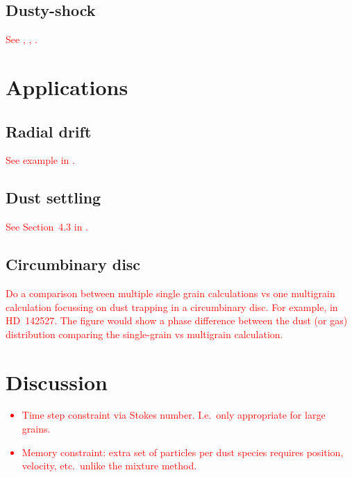 \documentclass[fleqn,usenatbib]{mnras}
\begin{document}
\subsection{Dusty-shock}

\textcolor{red}{
See \citet{Benitez-Llambay2019ApJS..241...25B},
\citet{Laibe2012MNRAS.420.2345L}, \citet{Lehmann2018MNRAS.476.3185L}.
}


\section{Applications}

\subsection{Radial drift}

\textcolor{red}{
See example in \citet{Dipierro2018MNRAS.479.4187D}.
}

\subsection{Dust settling}

\textcolor{red}{
See Section~4.3 in \citet{Hutchison2018MNRAS.476.2186H}.
}

\subsection{Circumbinary disc}

\textcolor{red}{
Do a comparison between multiple single grain calculations vs one multigrain
calculation focussing on dust trapping in a circumbinary disc. For example, in
HD~142527. The figure would show a phase difference between the dust (or gas)
distribution comparing the single-grain vs multigrain calculation.
}

\section{Discussion}

\textcolor{red}{
\begin{itemize}
   \item Time step constraint via Stokes number. I.e.\ only appropriate for
      large grains.
   \item Memory constraint: extra set of particles per dust species requires
      position, velocity, etc.\ unlike the mixture method.
\end{itemize}
}
\end{document}
